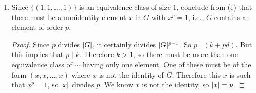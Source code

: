\begin{enumerate}
\begin{proof}
    We have shown that if $[\alpha]$ has exactly $n$ elements, then
    $n = 1$ or $n = p$. Since the equivalence classes partition
    $\mathcal{S}$, we see that
    \begin{equation*}
      \ord{G}^{p-1} = \ord{\mathcal{S}} = k + pd,
    \end{equation*}
    where $k$ is the number of classes of size $1$ and $d$ is the
    number of classes of size $p$.
  \end{proof}
\item Since $\{(1,1,\dots,1)\}$ is an equivalence class of size $1$,
  conclude from (e) that there must be a nonidentity element $x$ in
  $G$ with $x^p = 1$, i.e., $G$ contains an element of order $p$.
  \begin{proof}
    Since $p$ divides $\lvert{G}\rvert$, it certainly divides
    $\lvert{G}\rvert^{p-1}$. So $p\mid(k + pd)$. But this implies that
    $p\mid k$. Therefore $k > 1$, so there must be more than one
    equivalence class of $\sim$ having only one element. One of these
    must be of the form $(x,x,\dots,x)$ where $x$ is not the identity
    of $G$. Therefore this $x$ is such that $x^p = 1$, so $\lvert{x}\rvert$
    divides $p$. We know $x$ is not the identity, so $\lvert{x}\rvert = p$.
  \end{proof}
\end{enumerate}

